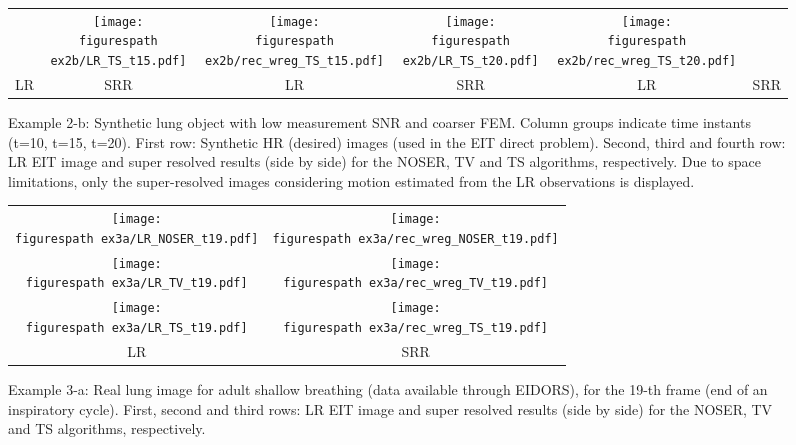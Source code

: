 \documentclass[10pt]{IEEEtran}
\newcommand{\figurespath}{figs/}
\begin{document}
\begin{figure*}[!htb]
\begin{center}
\begin{tabular}{cc||cc||cc}
  &
  \texttt{[image: \\figurespath ex2b/LR\_TS\_t15.pdf]}  &
  \texttt{[image: \\figurespath ex2b/rec\_wreg\_TS\_t15.pdf]}
  &
  \texttt{[image: \\figurespath ex2b/LR\_TS\_t20.pdf]}  &
  \texttt{[image: \\figurespath ex2b/rec\_wreg\_TS\_t20.pdf]} \\
  LR   &   SRR   &   LR   &   SRR   &   LR   &   SRR
\end{tabular}
\end{center}
\caption{Example 2-b: Synthetic lung object with low measurement SNR and coarser FEM. Column groups indicate time instants (t=10, t=15, t=20). First row: Synthetic HR (desired) images (used in the EIT direct problem). Second, third and fourth row: LR EIT image and super resolved results (side by side) for the NOSER, TV and TS algorithms, respectively. Due to space limitations, only the super-resolved images considering motion estimated from the LR observations is displayed.}
\label{ex2b_results}
\end{figure*}






















\renewcommand{\sizeA}{3.5}%
\begin{figure}[htb] %
\begin{center}
%
\begin{tabular}{cc}
  \texttt{[image: \\figurespath ex3a/LR\_NOSER\_t19.pdf]}  &
  \texttt{[image: \\figurespath ex3a/rec\_wreg\_NOSER\_t19.pdf]}\\
  \texttt{[image: \\figurespath ex3a/LR\_TV\_t19.pdf]}  &
  \texttt{[image: \\figurespath ex3a/rec\_wreg\_TV\_t19.pdf]}\\
  \texttt{[image: \\figurespath ex3a/LR\_TS\_t19.pdf]}  &
  \texttt{[image: \\figurespath ex3a/rec\_wreg\_TS\_t19.pdf]} \\
  LR   &   SRR 
\end{tabular}
\end{center}
\caption{Example 3-a: Real lung image for adult shallow breathing  (data available through EIDORS), for the 19-th frame (end of an inspiratory cycle). First, second and third rows: LR EIT image and super resolved results (side by side) for the NOSER, TV and TS algorithms, respectively.}
\label{ex3a_results}
\end{figure}
\end{document}
